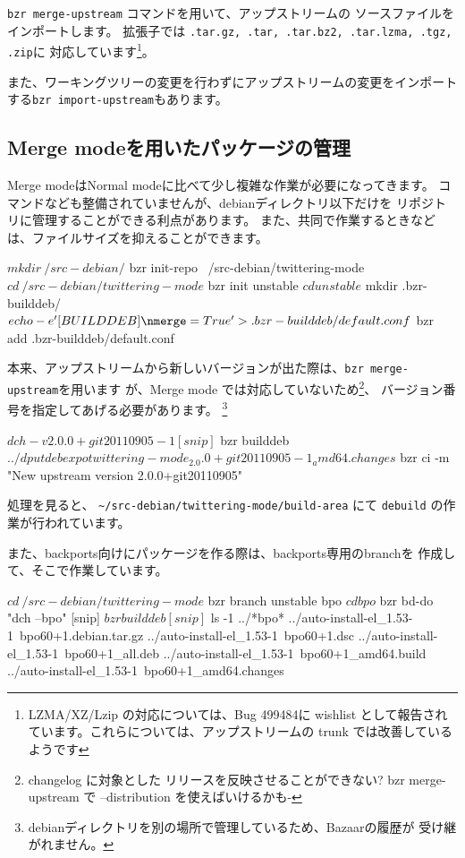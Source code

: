 \documentclass[mingoth,a4paper]{jsarticle}
\begin{document}
\verb|bzr merge-upstream| コマンドを用いて、アップストリームの
ソースファイルをインポートします。
拡張子では \verb|.tar.gz, .tar, .tar.bz2, .tar.lzma, .tgz, .zip|に
対応しています\footnote{LZMA/XZ/Lzip の対応については、Bug 499484に
wishlist として報告されています。これらについては、アップストリームの
trunk では改善しているようです}。

また、ワーキングツリーの変更を行わずにアップストリームの変更をインポート
する\verb|bzr import-upstream|もあります。

\subsection{Merge modeを用いたパッケージの管理}

Merge modeはNormal modeに比べて少し複雑な作業が必要になってきます。
コマンドなども整備されていませんが、debianディレクトリ以下だけを
リポジトリに管理することができる利点があります。
また、共同で作業するときなどは、ファイルサイズを抑えることができます。

\begin{commandline}
 $ mkdir ~/src-debian/
 $ bzr init-repo ~/src-debian/twittering-mode
 $ cd ~/src-debian/twittering-mode
 $ bzr init unstable
 $ cd unstable
 $ mkdir .bzr-builddeb/
 $ echo -e '[BUILDDEB]\nmerge = True' > .bzr-builddeb/default.conf
 $ bzr add .bzr-builddeb/default.conf
\end{commandline}

本来、アップストリームから新しいバージョンが出た際は、\verb|bzr merge-upstream|を用います
が、Merge mode では対応していないため\footnote{changelog に対象とした
リリースを反映させることができない? bzr merge-upstream で --distribution
を使えばいけるかも-}、
バージョン番号を指定してあげる必要があります。
\footnote{debianディレクトリを別の場所で管理しているため、Bazaarの履歴が
受け継がれません。}

\begin{commandline}
 $ dch -v 2.0.0+git20110905-1
[snip]
 $ bzr builddeb
 $ ../dput debexpo twittering-mode_2.0.0+git20110905-1_amd64.changes
 $ bzr ci -m "New upstream version 2.0.0+git20110905"
\end{commandline}

処理を見ると、
\verb&~/src-debian/twittering-mode/build-area&
にて \verb|debuild| の作業が行われています。

また、backports向けにパッケージを作る際は、backports専用のbranchを
作成して、そこで作業しています。

\begin{commandline}
 $ cd ~/src-debian/twittering-mode
 $ bzr branch unstable bpo
 $ cd bpo
 $ bzr bd-do "dch --bpo"
[snip]
 $ bzr builddeb
[snip]
 $ ls -1 ../*bpo*
../auto-install-el_1.53-1~bpo60+1.debian.tar.gz
../auto-install-el_1.53-1~bpo60+1.dsc
../auto-install-el_1.53-1~bpo60+1_all.deb
../auto-install-el_1.53-1~bpo60+1_amd64.build
../auto-install-el_1.53-1~bpo60+1_amd64.changes
\end{commandline}
\end{document}
